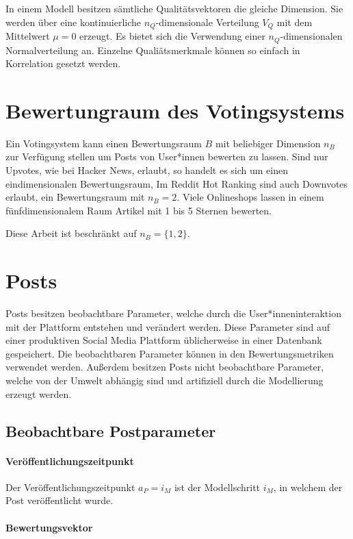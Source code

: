 In einem Modell besitzen sämtliche Qualitätsvektoren die gleiche Dimension. Sie werden über eine kontinuierliche $n_Q$-dimensionale Verteilung $V_Q$ mit dem Mittelwert $\mu = 0$ erzeugt. Es bietet sich die Verwendung einer $n_Q$-dimensionalen Normalverteilung an. Einzelne Qualiätsmerkmale können so einfach in Korrelation gesetzt werden. 

\section{Bewertungraum des Votingsystems}

Ein Votingsystem kann einen Bewertungsraum $B$ mit beliebiger Dimension $n_B$ zur Verfügung stellen um Posts von User*innen bewerten zu lassen. Sind nur Upvotes, wie bei Hacker News, erlaubt, so handelt es sich um einen eindimensionalen Bewertungsraum, Im Reddit Hot Ranking sind auch Downvotes erlaubt, ein Bewertungsraum mit $n_B = 2$. Viele Onlineshops lassen in einem fünfdimensionalem Raum Artikel mit 1 bis 5 Sternen bewerten.

Diese Arbeit ist beschränkt auf $n_B = \{1,2\}$. 

\section{Posts}

Posts besitzen beobachtbare Parameter, welche durch die User*inneninteraktion mit der Plattform entstehen und verändert werden. Diese Parameter sind auf einer produktiven Social Media Plattform üblicherweise in einer Datenbank gespeichert. Die beobachtbaren Parameter können in den Bewertungsmetriken verwendet werden.
Außerdem besitzen Posts nicht beobachtbare Parameter, welche von der Umwelt abhängig sind und artifiziell durch die Modellierung erzeugt werden.

\subsection{Beobachtbare Postparameter}

\paragraph{Veröffentlichungszeitpunkt}
Der Veröffentlichungszeitpunkt $a_P = i_M$ ist der Modellschritt $i_M$, in welchem der Post veröffentlicht wurde.

\paragraph{Bewertungsvektor}

